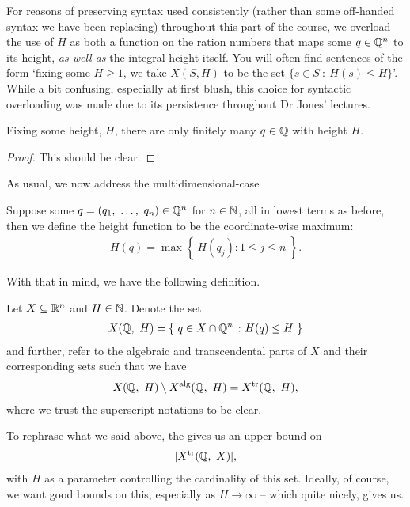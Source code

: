 \begin{svgraybox}
  For reasons of preserving syntax used consistently (rather than some off-handed syntax we have been replacing) throughout this part of the course, we overload the use of $H$ as both a function on the ration numbers that maps some $q \in \Q^n$ to its height, \emph{as well as} the integral height itself. You will often find sentences of the form `fixing some $H \geq 1$, we take $X(S, H)$ to be the set $\{ s \in S \ \colon \ H(s) \leq H \}$'. While a bit confusing, especially at first blush, this choice for syntactic overloading was made due to its persistence throughout Dr Jones' lectures.
\end{svgraybox}


\begin{corollary}
  Fixing some height, $H$, there are only finitely many $q \in \Q$ with height $H$.
\end{corollary}
\begin{proof}
  This should be clear.
\end{proof}

As usual, we now address the multidimensional-case
\begin{definition}
  Suppose some $q = (\vonevm{q}{n}) \in \Q^n$ for $n \in \N$, all in lowest terms as before, then we define the height function to be the coordinate-wise maximum:
    \begin{align*}
      H(q) = \max{ \left\{ \ H(q_j) \colon 1 \leq j \leq n \ \right\} }.
    \end{align*}
  \label{defn:Qn_height}
\end{definition}

With that in mind, we have the following definition.
\begin{definition}
  Let $\XRn[X]{n}$ and $H \in \N$. Denote the set
    \begin{align*}
      \XQH[H] = \left\{ \ q \in X \cap \Q^n \ \colon H(q) \leq H \ \right\}
    \end{align*}
    and further, refer to the algebraic and transcendental parts of $X$ and their corresponding sets such that we have
    \begin{align*}
      \XQH[H] \setminus \XalgQH[H] = \XtrQH[H],
    \end{align*}
    where we trust the superscript notations to be clear.
  \label{defn:height_sets}
\end{definition}

To rephrase what we said above, the \pwt gives us an upper bound on
  \begin{align*}
    \card{\XtrQH[X]},
  \end{align*}
  with $H$ as a parameter controlling the cardinality of this set. Ideally, of course, we want good bounds on this, especially as $H \to \infty$ -- which quite nicely, \pw gives us.

